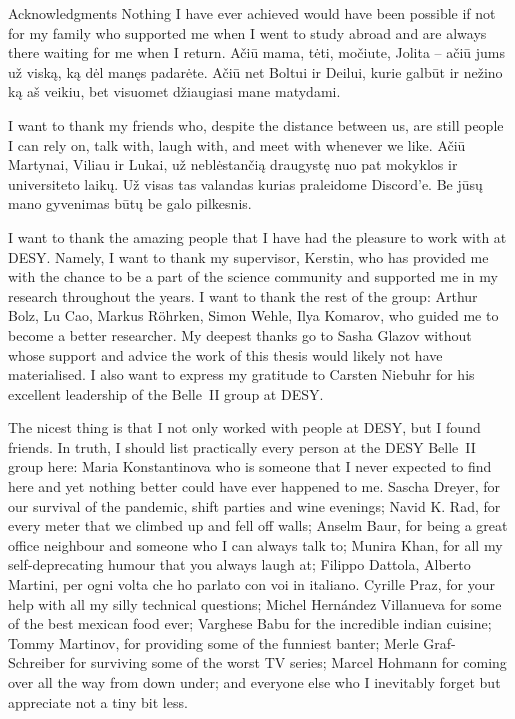 \begin{abstractpage}{Acknowledgments}
    Nothing I have ever achieved would have been possible if not for my family who supported me
    when I went to study abroad and are always there waiting for me when I return.
    Ačiū mama, tėti, močiute, Jolita -- ačiū jums už viską, ką dėl manęs padarėte.
    Ačiū net Boltui ir Deilui, kurie galbūt ir nežino ką aš veikiu, bet visuomet džiaugiasi mane matydami.

    I want to thank my friends who, despite the distance between us, are still people I can rely on, talk with,
    laugh with, and meet with whenever we like.
    Ačiū Martynai, Viliau ir Lukai, už neblėstančią draugystę nuo pat mokyklos ir universiteto laikų.
    Už visas tas valandas kurias praleidome Discord'e.
    Be jūsų mano gyvenimas būtų be galo pilkesnis.

    I want to thank the amazing people that I have had the pleasure to work with at DESY.
    Namely, I want to thank my supervisor, Kerstin, who has provided me with the chance to be a part of the science community
    and supported me in my research throughout the years.
    I want to thank the rest of the group: Arthur Bolz, Lu Cao, Markus R\"ohrken, Simon Wehle, Ilya Komarov, who guided me to become a better researcher.
    My deepest thanks go to Sasha Glazov without whose support and advice the work of this thesis would likely not have materialised.
    I also want to express my gratitude to Carsten Niebuhr for his excellent leadership of the Belle~II group at DESY.

    The nicest thing is that I not only worked with people at DESY, but I found friends.
    In truth, I should list practically every person at the DESY Belle~II group here:
    Maria Konstantinova who is someone that I never expected to find here and yet nothing better could have ever happened to me.
    Sascha Dreyer, for our survival of the pandemic, shift parties and wine evenings;
    Navid K. Rad, for every meter that we climbed up and fell off walls;
    Anselm Baur, for being a great office neighbour and someone who I can always talk to;
    Munira Khan, for all my self-deprecating humour that you always laugh at;
    Filippo Dattola, Alberto Martini, per ogni volta che ho parlato con voi in italiano.
    Cyrille Praz, for your help with all my silly technical questions;
    Michel Hern\'andez Villanueva for some of the best mexican food ever;
    Varghese Babu for the incredible indian cuisine;
    Tommy Martinov, for providing some of the funniest banter;
    Merle Graf-Schreiber for surviving some of the worst TV series;
    Marcel Hohmann for coming over all the way from down under;
    and everyone else who I inevitably forget but appreciate not a tiny bit less.
    

\end{abstractpage}

